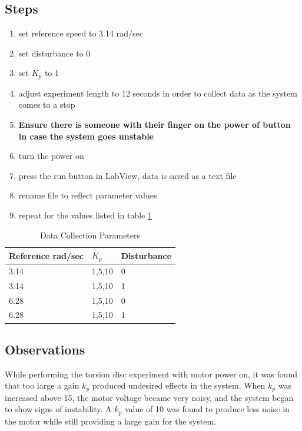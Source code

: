 \documentclass[11pt,titlepage]{article}
\begin{document}
    \subsection*{Steps}
        \begin{enumerate}
            \itemsep0em 
            \item set reference speed to 3.14 rad/sec
            \item set disturbance to 0
            \item set $K_p$ to 1
            \item adjust experiment length to 12 seconds in order to collect data as the system comes to a stop
            \item \textbf{Ensure there is someone with their finger on the power of button in case the system goes unstable}
            \item turn the power on
            \item press the run button in LabView, data is saved as a text file
            \item rename file to reflect parameter values
            \item repeat for the values listed in table \ref{table:data_param}
        \end{enumerate}
        \begin{table}[H]
            \centering
            \begin{tabular}{|m{4cm}|m{3cm}|m{3cm}|} 
                \hline
                Reference rad/sec & $K_p$ & Disturbance \\ 
                \hline
                3.14 & 1,5,10 & 0\\
                \hline
                3.14 & 1,5,10 & 1\\
                \hline
                6.28 & 1,5,10 & 0 \\
                \hline
                6.28 & 1,5,10 & 1 \\
                \hline
            \end{tabular}
            \caption{Data Collection Parameters} \label{table:data_param}
        \end{table}
        \subsection{Observations}
        While performing the torsion disc experiment with motor power on, it was found that too large a gain $k_p$ produced undesired effects in the system. When $k_p$ was increased above 15, the motor voltage became very noisy, and the system began to show signs of instability. A $k_p$ value of 10 was found to produce less noise in the motor while still providing a large gain for the system. 
\end{document}
